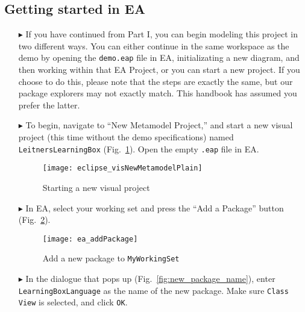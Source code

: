 \newpage
\subsection{Getting started in EA}
\visHeader
\hypertarget{static:starting vis}{}

\begin{itemize}
  
\item[$\blacktriangleright$]  If you have continued from Part I, you can begin modeling this project in two different ways. You can either continue in the same
workspace as the demo by opening the \texttt{demo.eap} file in EA, initializating a new diagram, and then working within that EA Project, or you can start a new
project. If you choose to do this, please note that the steps are exactly the same, but our package explorers may not exactly match. This handbook has assumed
you prefer the latter.

\item[$\blacktriangleright$]  To begin, navigate to ``New Metamodel Project,'' and start a new visual project (this time without the demo specifications) named
\texttt{LeitnersLearningBox} (Fig.~\ref{fig:new_visModel}). Open the empty \texttt{.eap} file in EA.

\begin{figure}[htbp]
	\centering
  \texttt{[image: eclipse\_visNewMetamodelPlain]}
	\caption{Starting a new visual project}
	\label{fig:new_visModel}
\end{figure}

\newpage

\item[$\blacktriangleright$] In EA, select your working set and press the ``Add a Package'' button (Fig.~\ref{fig:new_package}).

\begin{figure}[htbp]
	\centering
  \texttt{[image: ea\_addPackage]}
	\caption{Add a new package to \texttt{MyWorkingSet}}
	\label{fig:new_package}
	\vspace{0.5cm}
\end{figure}

\vspace{1.0cm}

\item[$\blacktriangleright$] In the dialogue that pops up (Fig.~\ref{fig:new_package_name}), enter \texttt{LearningBoxLanguage} as the name of the new
package. Make sure \texttt{Class View} is selected, and click \texttt{OK}.


\end{itemize}
